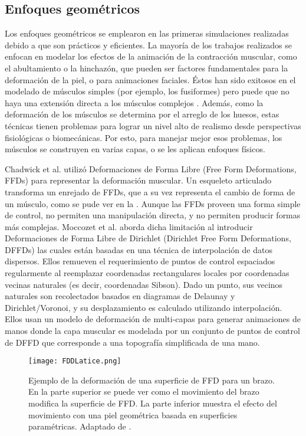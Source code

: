 \subsection{Enfoques geométricos}

Los enfoques geométricos se emplearon en las primeras simulaciones realizadas debido a que son prácticos y eficientes. La mayoría de los trabajos realizados se enfocan en modelar los efectos de la animación de la contracción muscular, como el abultamiento o la hinchazón, que pueden ser factores fundamentales para la deformación de la piel, o para animaciones faciales. Éstos han sido exitosos en el modelado de músculos simples (por ejemplo, los fusiformes) pero puede que no haya una extensión directa a los músculos complejos \citep{Scheepers:1997, wilhelms1997anatomically}. Además, como la deformación de los músculos se determina por el arreglo de los huesos, estas técnicas tienen problemas para lograr un nivel alto de realismo desde perspectivas fisiológicas o biomecánicas. Por esto, para manejar mejor esos problemas, los músculos se construyen en varias capas, o se les aplican enfoques físicos.

Chadwick et al. \citep{Chadwick:1989} utilizó Deformaciones de Forma Libre (Free Form Deformations, FFDs) para representar la deformación muscular. Un esqueleto articulado transforma un enrejado de FFDs, que a su vez representa el cambio de forma de un músculo, como se pude ver en la . Aunque las FFDs proveen una forma simple de control, no permiten una manipulación directa, y no permiten producir formas más complejas. Moccozet et al. \cite{moccozet1997dirichlet} aborda dicha limitación al introducir Deformaciones de Forma Libre de Dirichlet (Dirichlet Free Form Deformations, DFFDs) las cuales están basadas en una técnica de interpolación de datos dispersos. Ellos remueven el requerimiento de puntos de control espaciados regularmente al reemplazar coordenadas rectangulares locales por coordenadas vecinas naturales (es decir, coordenadas Sibson). Dado un punto, sus vecinos naturales son recolectados basados en diagramas de Delaunay y Dirichlet/Voronoi, y su desplazamiento es calculado utilizando interpolación. Ellos usan un modelo de deformación de multi-capas para generar animaciones de manos donde la capa muscular es modelada por un conjunto de puntos de control de DFFD que corresponde a una topografía simplificada de una mano.

\begin{figure}
	\centering
		\texttt{[image: FDDLatice.png]}
		\caption[Ejemplo de la deformación de una superficie de FFD para un brazo.]{Ejemplo de la deformación de una superficie de FFD para un brazo. En la parte superior se puede ver como el movimiento del brazo modifica la superficie de FFD. La parte inferior muestra el efecto del movimiento con una piel geométrica basada en superficies paramétricas. Adaptado de \citep{Chadwick:1989}.}
		\label{fig:FFDLatice}
\end{figure}

